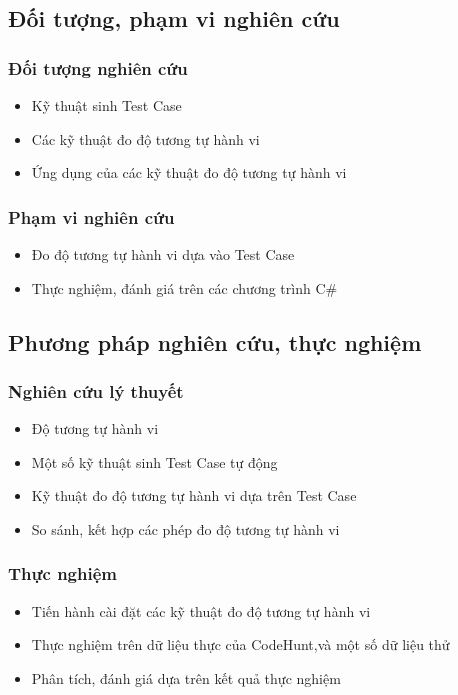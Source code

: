 	\subsection*{Đối tượng, phạm vi nghiên cứu}	
		\subsubsection*{Đối tượng nghiên cứu}
		\begin{itemize}
		\item Kỹ thuật sinh Test Case
		\item Các kỹ thuật đo độ tương tự hành vi
		\item Ứng dụng của các kỹ thuật đo độ tương tự hành vi
		\end{itemize}
	
		\subsubsection*{Phạm vi nghiên cứu}
		\begin{itemize}
		\item  Đo độ tương tự hành vi dựa vào Test Case
		\item  Thực nghiệm, đánh giá trên các chương trình C\#
		\end{itemize}


	\subsection*{Phương pháp nghiên cứu, thực nghiệm}
		\subsubsection*{Nghiên cứu lý thuyết}
			\begin{itemize}
			\item Độ tương tự hành vi
			\item Một số kỹ thuật sinh Test Case tự động
			\item Kỹ thuật đo độ tương tự hành vi dựa trên Test Case
			\item So sánh, kết hợp các phép đo độ tương tự hành vi
			\end{itemize}
		
		\subsubsection*{Thực nghiệm}
			\begin{itemize}
			\item Tiến hành cài đặt các kỹ thuật đo độ tương tự hành vi
			\item Thực nghiệm trên dữ liệu thực của CodeHunt,và một số dữ liệu thử
			\item Phân tích, đánh giá dựa trên kết quả thực nghiệm
			\end{itemize}


